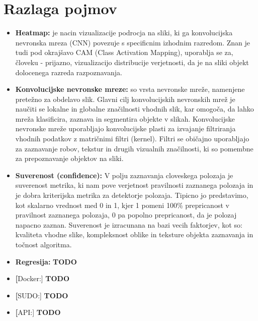 \documentclass[a4paper,twoside,openright,12pt,slovene]{book}
\begin{document}
\chapter{Razlaga pojmov} \label{razlaga_pojmov}
\begin{itemize}
    \item \textbf{Heatmap:} \label{heatmap} je nacin vizualizacije podrocja na sliki, ki ga konvolucijska nevronska mreza (CNN) povezuje s specificnim izhodnim razredom. Znan je tudi pod okrajšavo CAM (Class Activation Mapping), uporablja se za, človeku - prijazno, vizualizacijo distribucije verjetnosti, da je na sliki objekt dolocenega razreda razpoznavanja. \cite{heatmap_website}

    \item \textbf{Konvolucijske nevronske mreze:} \label{cnn}so vrsta nevronske mreže, namenjene pretežno za obdelavo slik. Glavni cilj konvolucijskih nevronskih mrež je naučiti se lokalne in globalne značilnosti vhodnih slik, kar omogoča, da lahko mreža klasificira, zaznava in segmentira objekte v slikah. Konvolucijske nevronske mreže uporabljajo konvolucijske plasti za izvajanje filtriranja vhodnih podatkov z matričnimi filtri (kernel). Filtri se običajno uporabljajo za zaznavanje robov, tekstur in drugih vizualnih značilnosti, ki so pomembne za prepoznavanje objektov na sliki. \cite{cnn_clanek}

    \item \textbf{Suverenost (confidence):} \label{suverenost} V polju zaznavanja cloveskega polozaja je suverenost metrika, ki nam pove verjetnost pravilnosti zaznanega polozaja in je dobra kriterijska metrika za detektorje polozaja. Tipicno jo predstavimo, kot skalarno vrednost med 0 in 1, kjer 1 pomeni 100\% prepricanost v pravilnost zaznanega polozaja, 0 pa popolno prepricanost, da je polozaj napacno zaznan. Suverenost je izracunana na bazi vecih faktorjev, kot so: kvaliteta vhodne slike, kompleksnost oblike in teksture objekta zaznavanja in točnost algoritma. \cite{confidence_clanek}\cite{confidence_website}

    \item \textbf{Regresija:} \label{regresija }\textbf{TODO}

    \item \textbf[Docker:] \label{docker} \textbf{TODO}

    \item \textbf[SUDO:] \label{sudo} \textbf{TODO}

    \item \textbf[API:] \label{api} \textbf{TODO}


\end{itemize}
\end{document}

